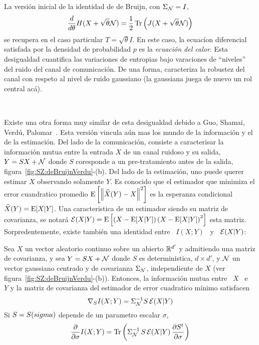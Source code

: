 La  versi\'on  inicial  de la  identidad  de  de  Bruijn, con  $\Sigma_{\mathcal{N}}  =
I$,
%
\[
\frac{d}{d\theta}     H(X+\sqrt{\theta}    \mathcal{N})    =     \frac12    \operatorname{Tr}\left(
  J(X+\sqrt{\theta} \mathcal{N}) \right)
\]
%
se  recupera en el  caso particular  $T =  \sqrt{\theta} I$.   En este  caso, la
ecuac\'ion diferencial satisfada por la  densidad de probabilidad $p$ es la {\it
  ecuaci\'on  del  calor}.   Esta  desigualdad  cuantifica  las  variaciones  de
entropias   bajo   varaciones   de   ``niveles''   del  ruido   del   canal   de
comunicaci\'on. De una  forma, caracteriza la robustez del  canal con respeto al
nivel de ruido gaussiano (la gaussiana juega de nuevo un rol central ac\'a).

\

Existe una  otra forma  muy similar  de esta desigualdad  debido a  Guo, Shamai,
Verd\'u, Palomar~\cite{GuoSha05, PalVer06}. Esta versi\'on vincula a\'un mas los
mundo  de  la   informaci\'on  y  el  de  la  estimaci\'on.    Del  lado  de  la
comunicaci\'on, consiste a caracterisar  la informaci\'on mutua entre la entrada
$X$ de un canal  ruidoso y su salida, $Y = S X +  \mathcal{N}$ donde $S$ coresponde a
un  pre-tratamiento antes  de la  salida, figura~\ref{fig:SZ:deBruijnVerdu}-(b).
Del lado de  la estimaci\'on, uno puede querer  estimar $X$ observando solamente
$Y$.  Es  conocido que el estimador  que minimiza el  error cuandratico promedio
$\operatorname{E}\left[  \left\| \widehat{X}(Y)  -  X \right\|^2  \right]$  es la  esperanza
condicional  $\widehat{X}(Y) =  \operatorname{E}[X|Y]$. Una  caracteristica de  un estimador
siendo su  matriz de covarianza,  se notar\'a $\mathcal{E}(X|Y)  = \operatorname{E}\left[ \left(  X -
    \operatorname{E}[X|Y]  \right) \left(  X  - \operatorname{E}[X|Y]  \right)^2  \right]$ esta  matriz.
Sorpredentemente,  existe  tambi\'en  una  identidad  entre \  $I(X;Y)$  \  y  \
$\mathcal{E}(X|Y)$:
%
\begin{teorema}
  Sea  $X$  un  vector  aleatorio  continuo  sobre  un  abierto  $\mathbb{R}^{d'}$  y
  admitiendo una  matriz de covarianza, y  sea $Y = S  X + \mathcal{N}$  donde $S$ es
  deterministica, $d  \times d'$, y $\mathcal{N}$  un vector gaussiano  centrado y de
  covarianza      $\Sigma_{\mathcal{N}}$,      independiente      de      $X$      (ver
  figura~\ref{fig:SZ:deBruijnVerdu}-(b)). Entonces, la informaci\'on mutua entre
  \ $X$ \  e \ $Y$ y la  matriz de covarianza del estimador  de error cuadratico
  m\'inimo satisfacen
  \[
  \nabla_S I(X;Y) = \Sigma_{\mathcal{N}}^{-1} S \, \mathcal{E}(X|Y)
  \]
  Si     $S    =     S(\\sigma)$    depende     de    un     parametro    escalar
  $\sigma$,
  \[
  \frac{\partial}{\partial \sigma} I(X;Y) = \operatorname{Tr}\left( \Sigma_{\mathcal{N}}^{-1} \, S \,
    \mathcal{E}(X|Y) \, \frac{\partial S^t}{\partial \sigma} \right)
  \]
\end{teorema}
